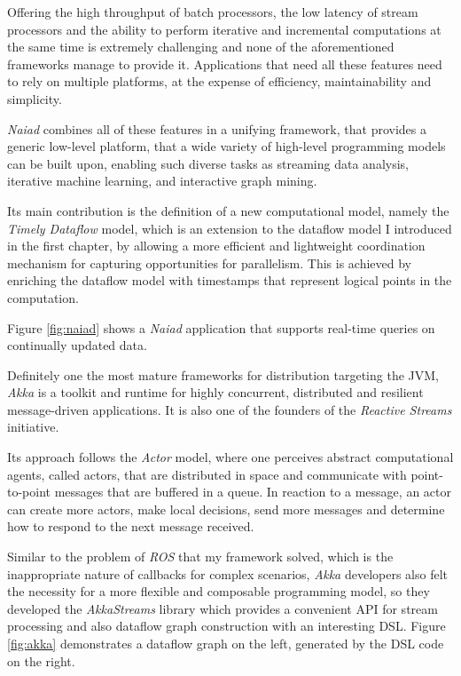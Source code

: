 \documentclass{dithesis}
\begin{document}
Offering the high throughput of batch processors, the low latency of stream processors and the ability to perform iterative and incremental computations at the same time is extremely challenging and none of the aforementioned frameworks manage to provide it. Applications that need all these features need to rely on multiple platforms, at the expense of efficiency, maintainability and simplicity.

\textit{Naiad}\cite{naiad} combines all of these features in a unifying framework, that provides a generic low-level platform, that a wide variety of high-level programming models can be built upon, enabling such diverse tasks as streaming data analysis, iterative machine learning, and interactive graph mining.

Its main contribution is the definition of a new computational model, namely the \textit{Timely Dataflow} model, which is an extension to the dataflow model I introduced in the first chapter, by allowing a more efficient and lightweight coordination mechanism for capturing opportunities for parallelism. This is achieved by enriching the dataflow model with timestamps that represent logical points in the computation.

Figure \ref{fig:naiad} shows a \textit{Naiad} application that supports real-time queries on continually updated data.



Definitely one the most mature frameworks for distribution targeting the JVM, \textit{Akka}\cite{akka} is a toolkit and runtime for highly concurrent, distributed and resilient message-driven applications. It is also one of the founders of the \textit{Reactive Streams}\cite{rss} initiative.

Its approach follows the \textit{Actor} model\cite{actor}, where one perceives abstract computational agents, called actors, that are distributed in space and communicate with point-to-point messages that are buffered in a queue. In reaction to a message, an actor can create more actors, make local decisions, send more messages and determine how to respond to the next message received.

Similar to the problem of \textit{ROS} that my framework solved, which is the inappropriate nature of callbacks for complex scenarios, \textit{Akka} developers also felt the necessity for a more flexible and composable programming model, so they developed the \textit{AkkaStreams} library which provides a convenient API for stream processing and also dataflow graph construction with an interesting DSL. Figure \ref{fig:akka} demonstrates a dataflow graph on the left, generated by the DSL code on the right.
\end{document}
